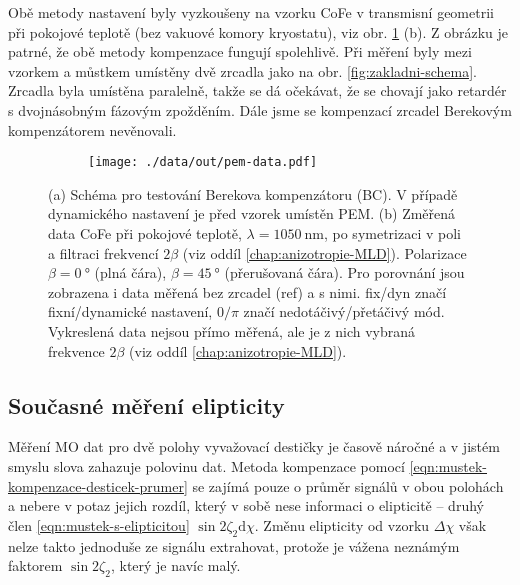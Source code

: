 Obě metody nastavení byly vyzkoušeny na vzorku CoFe v transmisní geometrii při pokojové teplotě (bez vakuové komory kryostatu), viz obr. \ref{fig:berek} (b).
Z obrázku je patrné, že obě metody kompenzace fungují spolehlivě.
Při měření byly mezi vzorkem a můstkem umístěny dvě zrcadla jako na obr. \ref{fig:zakladni-schema}.
Zrcadla byla umístěna paralelně, takže se dá očekávat, že se chovají jako retardér s dvojnásobným fázovým zpožděním.
Dále jsme se kompenzací zrcadel Berekovým kompenzátorem nevěnovali.

\begin{figure}[htbp]
    \centering
    \begin{subfigure}{.48\textwidth}
        \centering
    \end{subfigure}
    \begin{subfigure}{.48\textwidth}
        \centering
        \texttt{[image: ./data/out/pem-data.pdf]}
    \end{subfigure}
    \caption{(a) Schéma pro testování Berekova kompenzátoru (BC). V případě dynamického nastavení je před vzorek umístěn PEM. 
    (b) Změřená data CoFe při pokojové teplotě, $\lambda=\SI{1050}{\nano\meter}$, po symetrizaci v poli a filtraci frekvencí $2\beta$ (viz oddíl \ref{chap:anizotropie-MLD}). Polarizace $\beta=\SI{0}{\degree}$ (plná čára), $\beta=\SI{45}{\degree}$ (přerušovaná čára). Pro porovnání jsou zobrazena i data měřená bez zrcadel (ref) a s nimi. fix/dyn značí fixní/dynamické nastavení, $0/\pi$ značí nedotáčivý/přetáčivý mód. Vykreslená data nejsou přímo měřená, ale je z nich vybraná frekvence $2\beta$ (viz oddíl \ref{chap:anizotropie-MLD}).}
    \label{fig:berek}
\end{figure}

\subsection{Současné měření elipticity}
\label{chap:elipticita}

Měření MO dat pro dvě polohy vyvažovací destičky je časově náročné a v jistém smyslu slova zahazuje polovinu dat.
Metoda kompenzace pomocí \eqref{eqn:mustek-kompenzace-desticek-prumer} se zajímá pouze o průměr signálů v obou polohách a nebere v potaz jejich rozdíl, který v sobě nese informaci o elipticitě -- druhý člen \eqref{eqn:mustek-s-elipticitou} $\sin2\zeta_2 \textrm{d}\chi$.
Změnu elipticity od vzorku $\Delta\chi$ však nelze takto jednoduše ze signálu extrahovat, protože je vážena neznámým faktorem $\sin2\zeta_2$, který je navíc malý.


